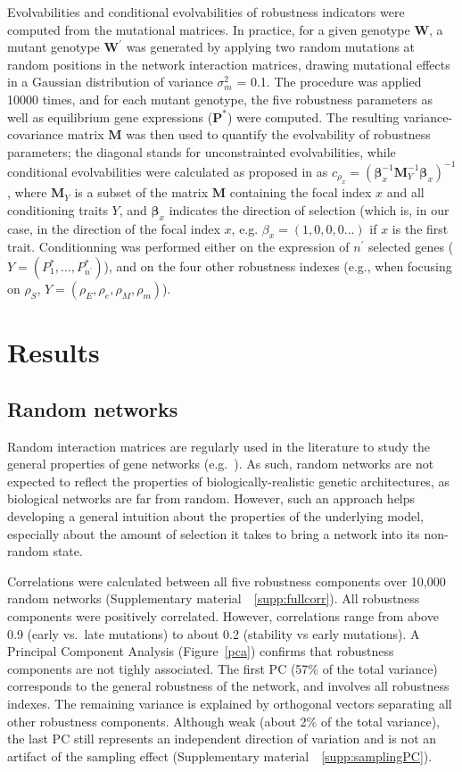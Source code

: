 \documentclass[10pt,a4paper]{article}
\newcommand{\stability}{{\rho_S}}
\newcommand{\earlyenv}{{\rho_E}}
\newcommand{\lateenv}{{\rho_e}}
\newcommand{\earlymut}{{\rho_M}}
\newcommand{\latemut}{{\rho_m}}
\newcommand{\SupMat}{Supplementary material~}
\begin{document}
Evolvabilities and conditional evolvabilities of robustness indicators were computed from the mutational matrices. In practice, for a given genotype $\bm W$, a mutant genotype $\bm W^\prime$ was generated by applying two random mutations at random positions in the network interaction matrices, drawing mutational effects in a Gaussian distribution of variance $\sigma_m^2$ = 0.1. The procedure was applied 10000 times, and for each mutant genotype, the five robustness parameters as well as equilibrium gene expressions ($\bm P^*$) were computed. The resulting variance-covariance matrix $\bm M$ was then used to quantify the evolvability of robustness parameters; the diagonal stands for unconstrainted evolvabilities, while conditional evolvabilities were calculated as proposed in \citet{HH08} as $c_{\rho_x} = (\bm \beta_x^{-1} \bm M_Y^{-1} \bm \beta_x)^{-1}$, where $\bm M_Y$ is a subset of the matrix $\bm M$ containing the focal index $x$ and all conditioning traits $Y$, and $\bm \beta_x$ indicates the direction of selection (which is, in our case, in the direction of the focal index $x$, e.g. $\beta_x = (1,0,0,0...)$ if $x$ is the first trait. Conditionning was performed either on the expression of $n^\prime$ selected genes ($Y = (P_1^*, \dots, P_{n^\prime}^*)$), and on the four other robustness indexes (e.g., when focusing on $\stability$, $Y = (\earlyenv, \lateenv, \earlymut, \latemut)$). 

\section{Results}

\subsection{Random networks}

Random interaction matrices are regularly used in the literature to study the general properties of gene networks (e.g.\ \cite{CTH11,PBF12}). As such, random networks are not expected to reflect the properties of biologically-realistic genetic architectures, as biological networks are far from random. However, such an approach helps developing a general intuition about the properties of the underlying model, especially about the amount of selection it takes to bring a network into its non-random state. 

Correlations were calculated between all five robustness components over 10,000 random networks (\SupMat~\ref{supp:fullcorr}). All robustness components were positively correlated. However, correlations range from above 0.9 (early vs.\ late mutations) to about 0.2 (stability vs early mutations). A Principal Component Analysis (Figure~\ref{pca}) confirms that robustness components are not tighly associated. The first PC (57\% of the total variance) corresponds to the general robustness of the network, and involves all robustness indexes. The remaining variance is explained by orthogonal vectors separating all other robustness components. Although weak (about 2\% of the total variance), the last PC still represents an independent direction of variation and is not an artifact of the sampling effect (\SupMat~\ref{supp:samplingPC}). 
\end{document}
